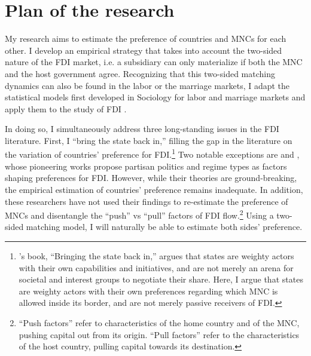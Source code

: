 \section{Plan of the research}

My research aims to estimate the preference of countries and MNCs for each
other. I develop an empirical strategy that takes into account the two-sided
nature of the FDI market, i.e. a subsidiary can only materialize if both the MNC
and the host government agree. Recognizing that this two-sided matching dynamics
can also be found in the labor or the marriage markets, I adapt the statistical
models first developed in Sociology for labor and marriage markets and apply
them to the study of FDI \citep{Logan1996, Logan2008}.

In doing so, I simultaneously address three long-standing issues in the FDI
literature. First, I ``bring the state back in,'' filling the gap in the
literature on the variation of countries' preference for
FDI.\footnote{\citet{Evans1985}'s book, ``Bringing the state back in,'' argues
  that states are weighty actors with their own capabilities and initiatives,
  and are not merely an arena for societal and interest groups to negotiate
  their share. Here, I argue that states are weighty actors with their own
  preferences regarding which MNC is allowed inside its border, and are not
  merely passive receivers of FDI.} Two notable exceptions are \citet{Pinto2013}
and \citet{Pandya2016}, whose pioneering works propose partisan politics and
regime types as factors shaping preferences for FDI. However, while their
theories are ground-breaking, the empirical estimation of countries' preference
remains inadequate. In addition, these researchers have not used their findings
to re-estimate the preference of MNCs and disentangle the ``push'' vs ``pull''
factors of FDI flow.\footnote{``Push factors'' refer to characteristics of the
  home country and of the MNC, pushing capital out from its origin. ``Pull
  factors'' refer to the characteristics of the host country, pulling capital
  towards its destination.} Using a two-sided matching model, I will naturally
be able to estimate both sides' preference.

